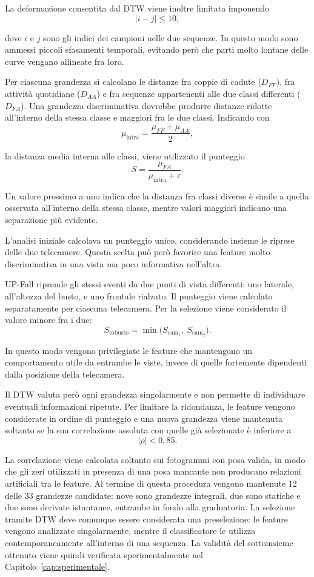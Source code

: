 La deformazione consentita dal DTW viene inoltre limitata imponendo
\[
|i-j|\leq 10,
\]

dove $i$ e $j$ sono gli indici dei campioni nelle due sequenze. In questo modo sono ammessi piccoli sfasamenti temporali, evitando però che parti molto lontane delle curve vengano allineate fra loro.

Per ciascuna grandezza si calcolano le distanze fra coppie di cadute ($D_{FF}$), fra attività quotidiane ($D_{AA}$) e fra sequenze appartenenti alle due classi differenti ($D_{FA}$).
Una grandezza discriminativa dovrebbe produrre distanze ridotte all'interno della stessa classe e maggiori fra le due classi. Indicando con
\[
\mu_{\mathrm{intra}}
=
\frac{\mu_{FF}+\mu_{AA}}{2},
\]

la distanza media interna alle classi, viene utilizzato il punteggio
\[
S=
\frac{\mu_{FA}}
     {\mu_{\mathrm{intra}}+\varepsilon}.
\]

Un valore prossimo a uno indica che la distanza fra classi diverse è simile a quella osservata all'interno della stessa classe, mentre valori maggiori indicano una separazione più evidente.

L'analisi iniziale calcolava un punteggio unico, considerando insieme le riprese delle due telecamere. Questa scelta può però favorire una feature molto discriminativa in una vista ma poco informativa nell'altra.

UP-Fall riprende gli stessi eventi da due punti di vista differenti: uno laterale, all'altezza del busto, e uno frontale rialzato. Il punteggio viene calcolato separatamente per ciascuna telecamera. Per la selezione viene considerato il valore minore fra i due:
\[
S_{\text{robusto}} = \min\big(S_{\text{cam}_1},\ S_{\text{cam}_2}\big).
\]

In questo modo vengono privilegiate le feature che mantengono un comportamento utile da entrambe le viste, invece di quelle fortemente dipendenti dalla posizione della telecamera.

Il DTW valuta però ogni grandezza singolarmente e non permette di individuare eventuali informazioni ripetute. Per limitare la ridondanza, le feature vengono considerate in ordine di punteggio e una nuova grandezza viene mantenuta soltanto se la sua correlazione assoluta con quelle già selezionate è inferiore a
\[
|\rho|<0{,}85.
\]

La correlazione viene calcolata soltanto sui fotogrammi con posa valida, in modo che gli zeri utilizzati in presenza di una posa mancante non producano relazioni artificiali tra le feature.
Al termine di questa procedura vengono mantenute 12 delle 33 grandezze candidate: nove sono grandezze integrali, due sono statiche e due sono derivate istantanee, entrambe in fondo alla graduatoria. La selezione tramite DTW deve comunque essere considerata una preselezione: le feature vengono analizzate singolarmente, mentre il classificatore le utilizza contemporaneamente all'interno di una sequenza. La validità del sottoinsieme ottenuto viene quindi verificata sperimentalmente nel Capitolo~\ref{cap:sperimentale}.

